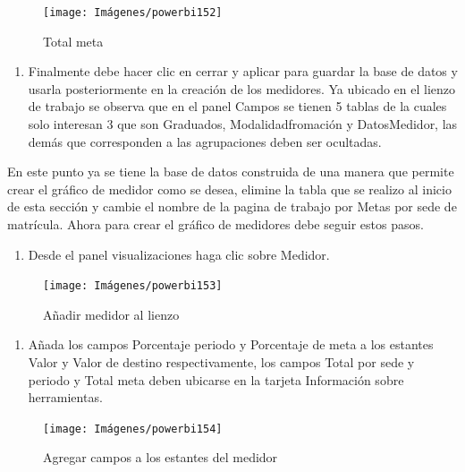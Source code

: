 \documentclass[
]{book}
\providecommand{\tightlist}{%
  \setlength{\itemsep}{0pt}\setlength{\parskip}{0pt}}
\begin{document}
\begin{figure}

{\centering \texttt{[image: Imágenes/powerbi152]} 

}

\caption{Total meta}\label{fig:totaldemetaenlabasededatos-fig}
\end{figure}

\begin{enumerate}
\def\labelenumi{\arabic{enumi}.}
\setcounter{enumi}{21}
\tightlist
\item
  Finalmente debe hacer clic en cerrar y aplicar para guardar la base de datos y usarla posteriormente en la creación de los medidores. Ya ubicado en el lienzo de trabajo se observa que en el panel Campos se tienen 5 tablas de la cuales solo interesan 3 que son Graduados, Modalidadfromación y DatosMedidor, las demás que corresponden a las agrupaciones deben ser ocultadas.
\end{enumerate}

En este punto ya se tiene la base de datos construida de una manera que permite crear el gráfico de medidor como se desea, elimine la tabla que se realizo al inicio de esta sección y cambie el nombre de la pagina de trabajo por Metas por sede de matrícula. Ahora para crear el gráfico de medidores debe seguir estos pasos.

\begin{enumerate}
\def\labelenumi{\arabic{enumi}.}
\tightlist
\item
  Desde el panel visualizaciones haga clic sobre Medidor.
\end{enumerate}

\begin{figure}

{\centering \texttt{[image: Imágenes/powerbi153]} 

}

\caption{Añadir medidor al lienzo}\label{fig:paso1medidor-fig}
\end{figure}

\begin{enumerate}
\def\labelenumi{\arabic{enumi}.}
\setcounter{enumi}{1}
\tightlist
\item
  Añada los campos Porcentaje periodo y Porcentaje de meta a los estantes Valor y Valor de destino respectivamente, los campos Total por sede y periodo y Total meta deben ubicarse en la tarjeta Información sobre herramientas.
\end{enumerate}

\begin{figure}

{\centering \texttt{[image: Imágenes/powerbi154]} 

}

\caption{Agregar campos a los estantes del medidor}\label{fig:paso2medidor-fig}
\end{figure}
\end{document}
